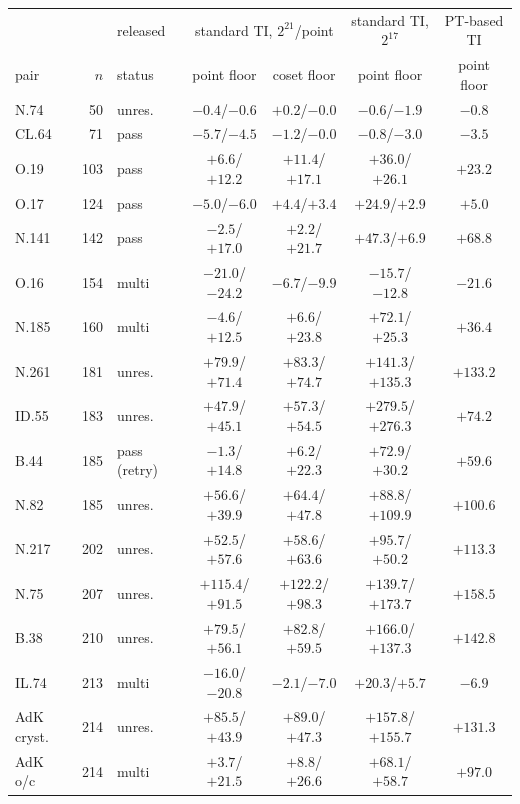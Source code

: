 \begin{tabular}{lrlcccc}
\toprule
 & & released & \multicolumn{2}{c}{standard TI, $2^{21}$/point} & standard TI, $2^{17}$ & PT-based TI \\
pair & $n$ & status & point floor & coset floor & point floor & point floor \\
\midrule
N.74 & 50 & unres. & $-0.4$/$-0.6$ & $+0.2$/$-0.0$ & $-0.6$/$-1.9$ & $-0.8$ \\
CL.64 & 71 & pass & $-5.7$/$-4.5$ & $-1.2$/$-0.0$ & $-0.8$/$-3.0$ & $-3.5$ \\
O.19 & 103 & pass & $+6.6$/$+12.2$ & $+11.4$/$+17.1$ & $+36.0$/$+26.1$ & $+23.2$ \\
O.17 & 124 & pass & $-5.0$/$-6.0$ & $+4.4$/$+3.4$ & $+24.9$/$+2.9$ & $+5.0$ \\
N.141 & 142 & pass & $-2.5$/$+17.0$ & $+2.2$/$+21.7$ & $+47.3$/$+6.9$ & $+68.8$ \\
O.16 & 154 & multi & $-21.0$/$-24.2$ & $-6.7$/$-9.9$ & $-15.7$/$-12.8$ & $-21.6$ \\
N.185 & 160 & multi & $-4.6$/$+12.5$ & $+6.6$/$+23.8$ & $+72.1$/$+25.3$ & $+36.4$ \\
N.261 & 181 & unres. & $+79.9$/$+71.4$ & $+83.3$/$+74.7$ & $+141.3$/$+135.3$ & $+133.2$ \\
ID.55 & 183 & unres. & $+47.9$/$+45.1$ & $+57.3$/$+54.5$ & $+279.5$/$+276.3$ & $+74.2$ \\
B.44 & 185 & pass (retry) & $-1.3$/$+14.8$ & $+6.2$/$+22.3$ & $+72.9$/$+30.2$ & $+59.6$ \\
N.82 & 185 & unres. & $+56.6$/$+39.9$ & $+64.4$/$+47.8$ & $+88.8$/$+109.9$ & $+100.6$ \\
N.217 & 202 & unres. & $+52.5$/$+57.6$ & $+58.6$/$+63.6$ & $+95.7$/$+50.2$ & $+113.3$ \\
N.75 & 207 & unres. & $+115.4$/$+91.5$ & $+122.2$/$+98.3$ & $+139.7$/$+173.7$ & $+158.5$ \\
B.38 & 210 & unres. & $+79.5$/$+56.1$ & $+82.8$/$+59.5$ & $+166.0$/$+137.3$ & $+142.8$ \\
IL.74 & 213 & multi & $-16.0$/$-20.8$ & $-2.1$/$-7.0$ & $+20.3$/$+5.7$ & $-6.9$ \\
AdK cryst. & 214 & unres. & $+85.5$/$+43.9$ & $+89.0$/$+47.3$ & $+157.8$/$+155.7$ & $+131.3$ \\
AdK o/c & 214 & multi & $+3.7$/$+21.5$ & $+8.8$/$+26.6$ & $+68.1$/$+58.7$ & $+97.0$ \\

\end{tabular}
